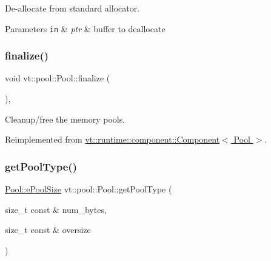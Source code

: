 De-\/allocate from standard allocator. 


\begin{DoxyParams}[1]{Parameters}
\mbox{\tt in}  & {\em ptr} & buffer to deallocate \\
\hline
\end{DoxyParams}
\mbox{\label{structvt_1_1pool_1_1_pool_a45a2880809625a77bb93c3dfcd9c7603}} 
\subsubsection{\texorpdfstring{finalize()}{finalize()}}
{\footnotesize\ttfamily void vt\+::pool\+::\+Pool\+::finalize (\begin{DoxyParamCaption}{ }\end{DoxyParamCaption})\hspace{0.3cm}{\ttfamily [override]}, {\ttfamily [virtual]}}



Cleanup/free the memory pools. 



Reimplemented from \hyperlink{structvt_1_1runtime_1_1component_1_1_component_a098e362de01af6054e5491fba671a959}{vt\+::runtime\+::component\+::\+Component$<$ Pool $>$}.

\mbox{\label{structvt_1_1pool_1_1_pool_a9aa5afbbea5a61265746c4d461502d62}} 
\subsubsection{\texorpdfstring{get\+Pool\+Type()}{getPoolType()}}
{\footnotesize\ttfamily \hyperlink{structvt_1_1pool_1_1_pool_ace8d36439e5e599a8ee68b2f1a6a6b28}{Pool\+::e\+Pool\+Size} vt\+::pool\+::\+Pool\+::get\+Pool\+Type (\begin{DoxyParamCaption}\item[{size\+\_\+t const \&}]{num\+\_\+bytes,  }\item[{size\+\_\+t const \&}]{oversize }\end{DoxyParamCaption})}



